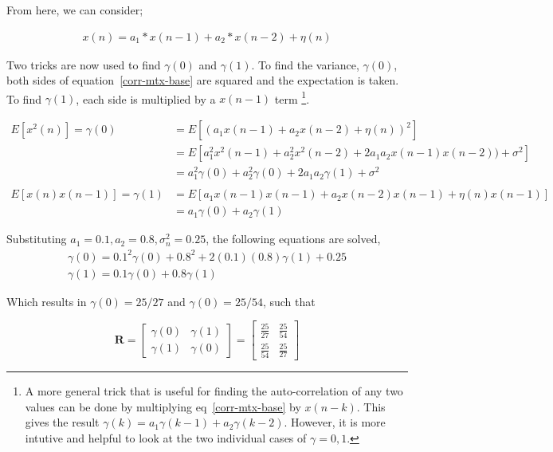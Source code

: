 \documentclass[main.tex]{subfiles}
\begin{document}
From here, we can consider\cite{Garc2012a};

\begin{align}
x(n) = a_1*x(n-1) + a_2*x(n-2) + \eta(n)
\label{corr-mtx-base}
\end{align}	

Two tricks are now used to find $\gamma(0)$ and $\gamma(1)$. To find the variance, $\gamma(0)$, both sides of equation~\ref{corr-mtx-base} are squared and the expectation is taken. To find $\gamma(1)$, each side is multiplied by a $x(n-1)$ term \footnote{ A more general trick that is useful for finding the auto-correlation of any two values can be done by multiplying eq~\ref{corr-mtx-base} by $x(n-k)$. This gives the result $\gamma(k) = a_1\gamma(k-1) + a_2\gamma(k-2)$. However, it is more intutive and helpful to look at the two individual cases of $\gamma = 0,1$. }.

\begin{align*}
E\left[x^2(n)\right] = \gamma(0) &= E\left[  (a_1x(n-1) + a_2x(n-2) + \eta(n))^2  \right]\\
&= E\left[a_1^2x^2(n-1) + a_2^2x^2(n-2) + 2a_1a_2x(n-1)x(n-2)) + \sigma^2\right]\\
&= a_1^2\gamma(0) + a_2^2\gamma(0) + 2a_1a_2\gamma(1) + \sigma^2\\
\\
E\left[x(n)x(n-1)\right] = \gamma(1) &= E\left[  a_1x(n-1)x(n-1) + a_2x(n-2)x(n-1) + \eta(n)x(n-1)  \right]\\
&= a_1\gamma(0) + a_2\gamma(1)
\end{align*}


Substituting $a_1 = 0.1, a_2 = 0.8, \sigma_n^2 = 0.25$, the following equations are solved,
\begin{align*}
\gamma(0) = 0.1^2\gamma(0) + 0.8^2 + 2(0.1)(0.8)\gamma(1) + 0.25\\
\gamma(1) = 0.1\gamma(0) + 0.8\gamma(1)
\end{align*}
 
Which results in $\gamma(0) = 25/27$ and $\gamma(0) = 25/54$, such that

\begin{equation}
\textbf{R} = \left[
\begin{array}{cc}
\gamma(0) & \gamma(1) \\[6pt]
\gamma(1) &  \gamma(0) \end{array}
\right] = \left[
\begin{array}{cc}
\frac{25}{27} & \frac{25}{54} \\[6pt]
\frac{25}{54} &  \frac{25}{27} \end{array}
\right]
\end{equation}
\end{document}
